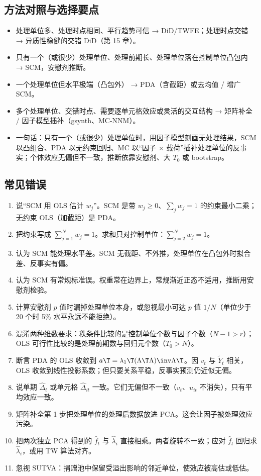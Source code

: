 \subsection{方法对照与选择要点}

\begin{itemize}
  \item 处理单位多、处理时点相同、平行趋势可信 → DiD/TWFE；处理时点交错 → 异质性稳健的交错 DiD（第 15 章）。
  \item 只有一个（或很少）处理单位、处理前期长、处理单位落在控制单位凸包内 → SCM，安慰剂推断。
  \item 一个处理单位但水平极端（凸包外） → PDA（含截距）或去均值 / 增广 SCM。
  \item 多个处理单位、交错时点、需要逐单元格效应或灵活的交互结构 → 矩阵补全 / 因子模型插补（gsynth、MC-NNM）。
  \item 一句话：只有一个（或很少）处理单位时，用因子模型刻画无处理结果，SCM 以凸组合、PDA 以无约束回归、MC 以“因子 × 载荷”插补处理单位的反事实；个体效应无偏但不一致，推断依靠安慰剂、大 $T_0$ 或 bootstrap。
\end{itemize}

\subsection{常见错误}

\begin{enumerate}
  \item 说“SCM 用 OLS 估计 $w_j$”。SCM 是带 $w_j\ge0$、$\sum_jw_j=1$ 的约束最小二乘；无约束 OLS（加截距）是 PDA。
  \item 把约束写成 $\sum_{j=1}^Nw_j=1$。求和只对控制单位：$\sum_{j=2}^Nw_j=1$。
  \item 认为 SCM 能处理水平差。SCM 无截距、不外推，处理单位在凸包外时拟合差、反事实有偏。
  \item 认为 SCM 有常规标准误。权重常在边界上，常规渐近正态不适用，推断用安慰剂检验。
  \item 计算安慰剂 $p$ 值时漏掉处理单位本身，或忽视最小可达 $p$ 值 $1/N$（单位少于 20 个时 5\% 水平永远不能拒绝）。
  \item 混淆两种维数要求：秩条件比较的是控制单位个数与因子个数（$N-1>r$）；OLS 可行性比较的是处理前期数与回归元个数（$T_0>N$）。
  \item 断言 PDA 的 OLS 收敛到 $a\T=\lambda_1\T(\Lambda\T\Lambda)\inv\Lambda\T$。因 $v_t$ 与 $\tilde Y_t$ 相关，OLS 收敛到线性投影系数；但只要关系平稳，反事实预测仍近似无偏。
  \item 说单期 $\hat\Delta_t$ 或单元格 $\hat\Delta_{it}$ 一致。它们无偏但不一致（$v_t$、$u_{it}$ 不消失），只有平均效应一致。
  \item 矩阵补全第 1 步把处理单位的处理后数据放进 PCA。这会让因子被处理效应污染。
  \item 把两次独立 PCA 得到的 $\hat f_t$ 与 $\hat\lambda_i$ 直接相乘。两者旋转不一致；应对 $\hat f_t$ 回归求 $\hat\lambda_i$，或用 TW 算法对齐。
  \item 忽视 SUTVA：捐赠池中保留受溢出影响的邻近单位，使效应被高估或低估。
\end{enumerate}

